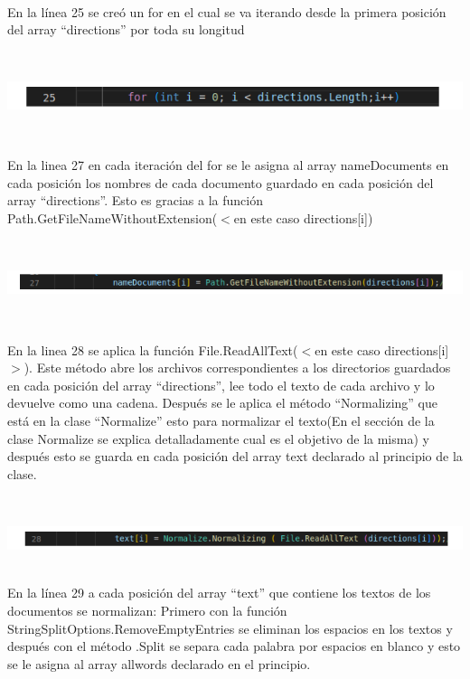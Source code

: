 \documentclass{article}
\begin{document}
{\

En la línea 25 se creó un for en el cual se va iterando desde la primera posición del array “directions” por toda su longitud

\

\centering
\includegraphics[height = 0.7 cm ]{Captura desde 2023-07-18 21-27-04.png}

\

En la linea 27 en cada iteración del for se le asigna al array nameDocuments en cada posición los nombres de cada documento guardado
en cada posición del array “directions”. Esto es gracias a la función  Path.GetFileNameWithoutExtension($<$en este caso directions[i]) 

\

\centering
\includegraphics[height = 0.6 cm ]{Captura desde 2023-07-18 21-31-27.png}

\

En la linea 28 se aplica la función File.ReadAllText($<$en este caso directions[i]$>$). Este método abre los archivos correspondientes a 
los directorios guardados en cada posición del array “directions”, lee todo el texto de cada archivo y lo devuelve como una cadena. 
Después se le aplica el método “Normalizing” que está en la clase “Normalize” esto para normalizar el texto(En el sección de la clase 
Normalize se explica detalladamente cual es el objetivo de la misma) y después esto se guarda en cada posición del array text declarado
al principio de la clase. 

\

\centering
\includegraphics[height = 0.6 cm ]{Captura desde 2023-07-18 21-42-49.png}\\

\

En la línea 29 a cada posición del array “text” que contiene los textos de los documentos se normalizan: Primero con la función 
StringSplitOptions.RemoveEmptyEntries se eliminan los espacios en los textos y después con el método .Split se separa cada palabra 
por espacios en blanco y esto se le asigna al array allwords declarado en el principio. 

}
\end{document}
